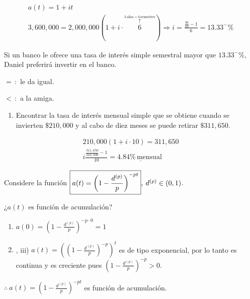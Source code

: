 \documentclass[
]{book}
\providecommand{\tightlist}{%
  \setlength{\itemsep}{0pt}\setlength{\parskip}{0pt}}
\theoremstyle{definition}
\theoremstyle{definition}
\theoremstyle{definition}
\theoremstyle{definition}
\theoremstyle{remark}
\begin{document}
\begin{align*}
&a(t) =1+it&\\
&3,600,000 = 2,000,000(1 + i\cdot \stackrel{\stackrel{3\, \text{años} = 6\, \text{semestres}}{\uparrow}}{6}) \Longrightarrow i = \frac{\frac{36}{10}-1}{6} = 13.33^{-}\%&
\end{align*}

Si un banco le ofrece una tasa de interés simple semestral mayor que \(13.33^{-} \%\), Daniel preferirá invertir en el banco.

\(= \, :\) le da igual.

\(< \, :\) a la amiga.

\begin{enumerate}
\def\labelenumi{\arabic{enumi}.}
\setcounter{enumi}{8}
\tightlist
\item
  Encontrar la tasa de interés mensual simple que se obtiene cuando se invierten \(\$210,000\) y al cabo de diez meses se puede retirar \(\$311,650\).
\end{enumerate}

\begin{align*}
&210,000(1+i\cdot 10) = 311,650& \\
&i \frac{\frac{311,650}{210,000}-1}{10} = \underline{4.84\% \, \text{mensual }}&
\end{align*}

Considere la función \(\boxed{\color{black}a(t) = \left(1 - \frac{d^{(p)}}{p}\right)^{-pt}} \color{black}, \: d^{(p)} \in (0,1)\).

¿\(a(t)\) es función de acumulación?

\begin{enumerate}
\def\labelenumi{\roman{enumi})}
\item
  \(a(0) = \left( 1 - \frac{d^{(p)}}{p}\right)^{-p\cdot0} = 1\)
\item
  , iii) \(a(t) = \left( \left(1 - \frac{d^{(p)}}{p}\right)^{-p}\right)^{t}\) es de tipo exponencial, por lo tanto es continua y es creciente pues \(\left(1 - \frac{d^{(p)}}{p}\right)^{-p} > 0\).
\end{enumerate}

\(\therefore \: a(t) = \left(1 - \frac{d^{(p)}}{p}\right)^{-pt}\) es función de acumulación.
\end{document}
